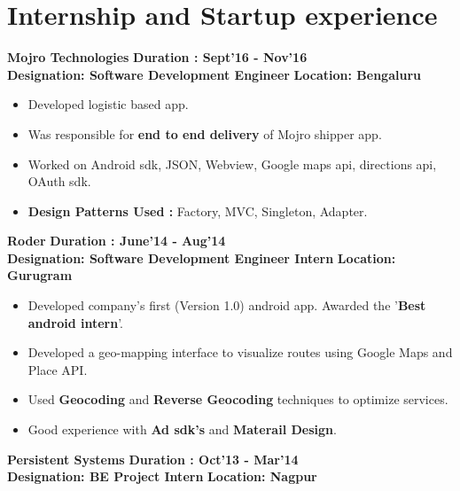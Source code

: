 \documentclass{article}
\begin{document}
\vspace*{.8cm}

\section{Internship and Startup experience}
\textbf{\large{Mojro Technologies}} \hspace*{10.5cm}
\textbf{Duration : Sept'16 - Nov'16 } \\ \textbf{Designation: Software Development Engineer}\hspace*{6.5cm}
\textbf{Location: Bengaluru} 

\vspace*{.051mm}
\begin{itemize}[noitemsep]
	\item Developed logistic based app.
	\item Was responsible for \textbf{end to end delivery} of Mojro shipper app. 
	\item Worked on Android sdk,  JSON, Webview, Google maps api, directions api, OAuth sdk.
	\item \textbf{Design Patterns Used :} Factory, MVC, Singleton, Adapter.
	
\end{itemize}


\vspace*{.3cm}
\textbf{\large{Roder}} \hspace*{13.1cm}
\textbf{Duration : June'14 - Aug'14 } \\ \textbf{Designation: Software Development Engineer Intern}\hspace*{5.2cm}
\textbf{Location: Gurugram} 

\vspace*{.051mm}
\begin{itemize}[noitemsep]
	\item Developed company's first (Version 1.0) android app. Awarded the '\textbf{Best android intern}'.
	\item Developed a geo-mapping interface to visualize routes using Google Maps and Place API.
	\item Used	\textbf{Geocoding} and \textbf{Reverse Geocoding} techniques to optimize services.
	\item Good experience with \textbf{Ad sdk's} and \textbf{Materail Design}.
\end{itemize}



\vspace*{.3cm}
\textbf{\large{Persistent Systems}} \hspace*{10.5cm}
\textbf{Duration : Oct'13 - Mar'14 } \\ \textbf{Designation: BE Project Intern}\hspace*{8.9cm}
\textbf{Location: Nagpur} 
\end{document}
